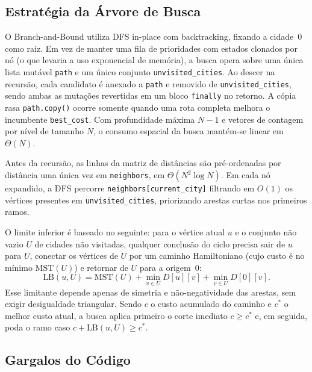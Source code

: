 \documentclass[12pt]{article}
\begin{document}
\subsection{Estratégia da Árvore de Busca}

O Branch-and-Bound utiliza DFS in-place com backtracking, fixando a cidade~0 como raiz. Em vez de manter uma fila de prioridades com estados clonados por nó (o que levaria a uso exponencial de memória), a busca opera sobre uma única lista mutável \texttt{path} e um único conjunto \texttt{unvisited\_cities}. Ao descer na recursão, cada candidato é anexado a \texttt{path} e removido de \texttt{unvisited\_cities}, sendo ambas as mutações revertidas em um bloco \texttt{finally} no retorno. A cópia rasa \texttt{path.copy()} ocorre somente quando uma rota completa melhora o incumbente \texttt{best\_cost}. Com profundidade máxima $N-1$ e vetores de contagem por nível de tamanho $N$, o consumo espacial da busca mantém-se linear em $\Theta(N)$.

Antes da recursão, as linhas da matriz de distâncias são pré-ordenadas por distância uma única vez em \texttt{neighbors}, em $\Theta(N^2 \log N)$. Em cada nó expandido, a DFS percorre \texttt{neighbors[current\_city]} filtrando em $O(1)$ os vértices presentes em \texttt{unvisited\_cities}, priorizando arestas curtas nos primeiros ramos.

O limite inferior é baseado no seguinte: para o vértice atual $u$ e o conjunto não vazio $U$ de cidades não visitadas, qualquer conclusão do ciclo precisa sair de $u$ para $U$, conectar os vértices de $U$ por um caminho Hamiltoniano (cujo custo é no mínimo $\mathrm{MST}(U)$) e retornar de $U$ para a origem~0:
\[
\mathrm{LB}(u, U) = \mathrm{MST}(U) + \min_{v \in U} D[u][v] + \min_{v \in U} D[0][v].
\]
Esse limitante depende apenas de simetria e não-negatividade das arestas, sem exigir desigualdade triangular. Sendo $c$ o custo acumulado do caminho e $c^*$ o melhor custo atual, a busca aplica primeiro o corte imediato $c \ge c^*$ e, em seguida, poda o ramo caso $c + \mathrm{LB}(u, U) \ge c^*$.

\subsection{Gargalos do Código}
\end{document}

